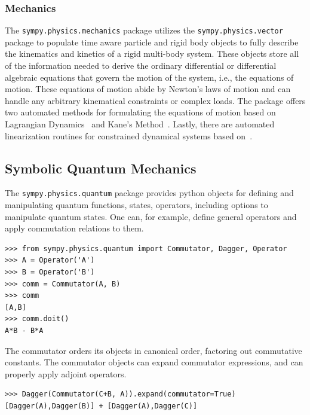 \subsubsection{Mechanics}

The \verb|sympy.physics.mechanics| package utilizes the \texttt{sympy.\allowbreak{}physics.\allowbreak{}vector} package
to populate time aware particle and rigid body objects to fully describe the
kinematics and kinetics of a rigid multi-body system. These objects store all
of the information needed to derive the ordinary differential or differential
algebraic equations that govern the motion of the system, i.e., the equations
of motion. These equations of motion abide by Newton's laws of motion and can
handle any arbitrary kinematical constraints or complex loads. The package
offers two automated methods for formulating the equations of motion based on
Lagrangian Dynamics~\cite{Lagrange1811} and Kane's Method~\cite{Kane1985}. Lastly, there
are automated linearization routines for constrained dynamical
systems based on~\cite{Peterson2014}.

\subsection{Symbolic Quantum Mechanics}

The \verb|sympy.physics.quantum| package provides python objects for defining and manipulating quantum functions, states, operators, including options to manipulate quantum states. One can, for example, define general operators and apply commutation relations to them.
\begin{verbatim}
>>> from sympy.physics.quantum import Commutator, Dagger, Operator
>>> A = Operator('A')
>>> B = Operator('B')
>>> comm = Commutator(A, B)
>>> comm
[A,B]
>>> comm.doit()
A*B - B*A
\end{verbatim}
The commutator orders its objects in canonical order, factoring out commutative constants. The commutator objects can expand commutator expressions, and can properly apply adjoint operators.
\begin{verbatim}
>>> Dagger(Commutator(C+B, A)).expand(commutator=True)
[Dagger(A),Dagger(B)] + [Dagger(A),Dagger(C)]
\end{verbatim}

